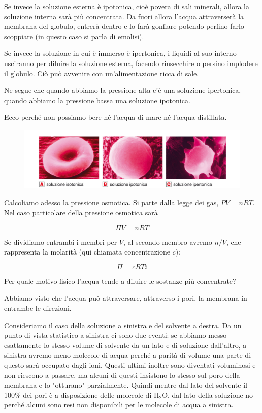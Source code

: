 Se invece la soluzione esterna è ipotonica, cioè povera di sali minerali, allora la soluzione interna sarà più concentrata. Da fuori allora l'acqua attraverserà la membrana del globulo, entrerà dentro e lo farà gonfiare potendo perfino farlo scoppiare (in questo caso si parla di emolisi).
 
Se invece la soluzione in cui è immerso è ipertonica, i liquidi al suo interno usciranno per diluire la soluzione esterna, facendo rinsecchire o persino implodere il globulo. Ciò può avvenire con un'alimentazione ricca di sale.

Ne segue che quando abbiamo la pressione alta c'è una soluzione ipertonica, quando abbiamo la pressione bassa una soluzione ipotonica.

Ecco perché non possiamo bere né l'acqua di mare né l'acqua distillata.

\begin{figure}[htp]
    \centering
    \includegraphics[width=14cm]{immagini/sangue.png}
\end{figure}

Calcoliamo adesso la pressione osmotica.
Si parte dalla legge dei gas, $PV=nRT$. Nel caso particolare della pressione osmotica sarà

$$\Pi V=nRT$$

Se dividiamo entrambi i membri per $V$, al secondo membro avremo $n/V$, che rappresenta la molarità (qui chiamata concentrazione $c$):

$$ \Pi = c R T i$$

Per quale motivo fisico l'acqua tende a diluire le sostanze più concentrate?

Abbiamo visto che l'acqua può attraversare, attraverso i pori, la membrana in entrambe le direzioni.

Consideriamo il caso della soluzione a sinistra e del solvente a destra. Da un punto di vista statistico a sinistra ci sono due eventi: se abbiamo messo esattamente lo stesso volume di solvente da un lato e di soluzione dall'altro, a sinistra avremo meno molecole di acqua perché a parità di volume una parte di questo sarà occupato dagli ioni. Questi ultimi inoltre sono diventati voluminosi e non riescono a passare, ma alcuni di questi insistono lo stesso sul poro della membrana e lo "otturano" parzialmente. Quindi mentre dal lato del solvente il 100\% dei pori è a disposizione delle molecole di H$_2$O, dal lato della soluzione no perché alcuni sono resi non disponibili per le molecole di acqua a sinistra.

